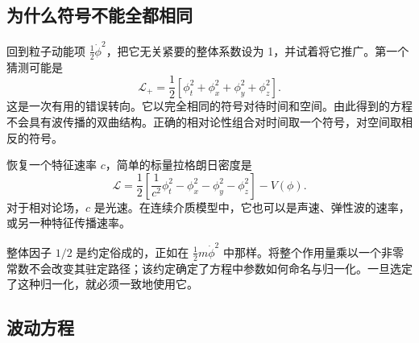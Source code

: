 \subsection{为什么符号不能全都相同}

回到粒子动能项 \(\tfrac12\dot\phi^2\)，把它无关紧要的整体系数设为 1，并试着将它推广。第一个猜测可能是
\begin{equation}
\mathcal{L}_{+}
=
\frac12
\left[
\phi_t^2+\phi_x^2+\phi_y^2+\phi_z^2
\right].
\label{eq:sr4-all-plus}
\end{equation}
这是一次有用的错误转向。它以完全相同的符号对待时间和空间。由此得到的方程不会具有波传播的双曲结构。正确的相对论性组合对时间取一个符号，对空间取相反的符号。

\begin{classroomqa}
\end{classroomqa}

恢复一个特征速率 \(c\)，简单的标量拉格朗日密度是
\begin{equation}
\boxed{
\mathcal{L}
=
\frac12
\left[
\frac{1}{c^2}\phi_t^2
-\phi_x^2-\phi_y^2-\phi_z^2
\right]
-V(\phi)
}.
\label{eq:sr4-scalar-lagrangian}
\end{equation}
对于相对论场，\(c\) 是光速。在连续介质模型中，它也可以是声速、弹性波的速率，或另一种特征传播速率。

整体因子 \(1/2\) 是约定俗成的，正如在 \(\tfrac12m\dot\phi^2\) 中那样。将整个作用量乘以一个非零常数不会改变其驻定路径；该约定确定了方程中参数如何命名与归一化。一旦选定了这种归一化，就必须一致地使用它。

\begin{classroomqa}
\end{classroomqa}

\subsection{波动方程}

